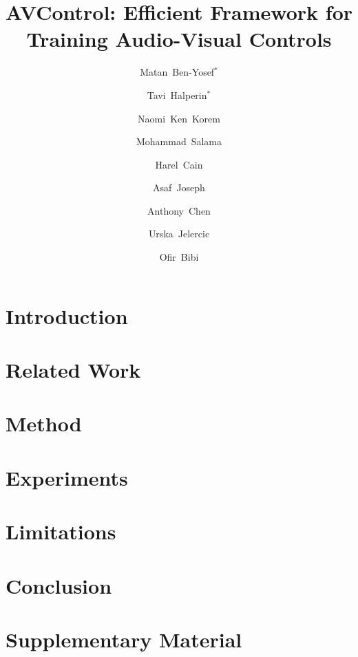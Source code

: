 \documentclass[runningheads]{llncs}
\begin{document}
\pagestyle{headings}
\mainmatter

\title{AVControl: Efficient Framework for Training Audio-Visual Controls}

\author{
Matan~Ben-Yosef$^*$ \and
Tavi~Halperin$^*$ \and
Naomi~Ken~Korem \and
Mohammad~Salama \and
Harel~Cain \and
Asaf~Joseph \and
Anthony~Chen \and
Urska~Jelercic \and
Ofir~Bibi
}

\maketitle

\let\thefootnote\relax{}

\begin{abstract}

\end{abstract}

\section{Introduction}

\section{Related Work}

\section{Method}
\label{sec:method}

\section{Experiments}

\section{Limitations}
\label{sec:limitations}

\section{Conclusion}



\clearpage




\clearpage
\section*{Supplementary Material}

\end{document}
